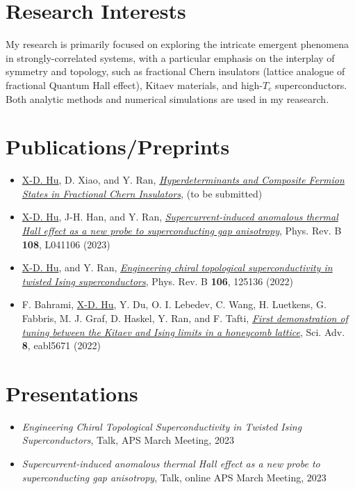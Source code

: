 \documentclass[10pt, letterpaper]{article}
\begin{document}
\section*{Research Interests}
My research is primarily focused on exploring the intricate emergent phenomena in strongly-correlated systems, with a particular emphasis on the interplay of symmetry and topology, such as fractional Chern insulators (lattice analogue of fractional Quantum Hall effect), Kitaev materials, and high-$T_c$ superconductors. Both analytic methods and numerical simulations are used in my reasearch.

\section*{Publications/Preprints}
\begin{itemize}
    \item \underline{X-D. Hu}, D. Xiao, and Y. Ran, \href{}{\emph{Hyperdeterminants and Composite Fermion States in Fractional Chern Insulators}},  (to be submitted)
    \item \underline{X-D. Hu}, J-H. Han, and Y. Ran, \href{https://journals.aps.org/prb/abstract/10.1103/PhysRevB.108.L041106}{\emph{Supercurrent-induced anomalous thermal Hall effect as a new probe to superconducting gap anisotropy}}, Phys. Rev. B {\bf 108}, L041106 (2023)
    \item \underline{X-D. Hu}, and Y. Ran, \href{https://journals.aps.org/prb/abstract/10.1103/PhysRevB.106.125136}{\emph{Engineering chiral topological superconductivity in twisted Ising superconductors}}, Phys. Rev. B {\bf 106}, 125136 (2022)
    \item F. Bahrami, \underline{X-D. Hu}, Y. Du, O. I. Lebedev, C. Wang, H. Luetkens, G. Fabbris, M. J. Graf, D. Haskel, Y. Ran, and F. Tafti, \href{https://www.science.org/doi/full/10.1126/sciadv.abl5671}{\emph{First demonstration of tuning between the Kitaev and Ising limits in a honeycomb lattice}}, Sci. Adv. {\bf 8}, eabl5671 (2022)
\end{itemize}


\section*{Presentations}
\begin{itemize}
    \item \emph{Engineering Chiral Topological Superconductivity in Twisted Ising Superconductors}, Talk, APS March Meeting, 2023
    \item \emph{Supercurrent-induced anomalous thermal Hall effect as a new probe to superconducting gap anisotropy}, Talk, online APS March Meeting, 2023
\end{itemize}
\end{document}
